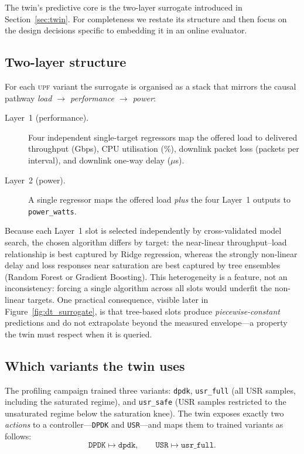 \documentclass[12pt, a4paper]{report}
\newcommand{\upf}{\textsc{upf}}
\newcommand{\code}[1]{\texttt{#1}}
\begin{document}
The twin's predictive core is the two-layer surrogate introduced in
Section~\ref{sec:twin}. For completeness we restate its structure and then
focus on the design decisions specific to embedding it in an online evaluator.

\subsection{Two-layer structure}

For each \upf{} variant the surrogate is organised as a stack that mirrors the
causal pathway \emph{load $\to$ performance $\to$ power}:

\begin{description}
  \item[Layer~1 (performance).] Four independent single-target regressors map
    the offered load to delivered throughput (Gbps), CPU utilisation (\%),
    downlink packet loss (packets per interval), and downlink one-way delay
    ($\mu$s).
  \item[Layer~2 (power).] A single regressor maps the offered load
    \emph{plus} the four Layer~1 outputs to \code{power\_watts}.
\end{description}

Because each Layer~1 slot is selected independently by cross-validated model
search, the chosen algorithm differs by target: the near-linear
throughput--load relationship is best captured by Ridge regression, whereas
the strongly non-linear delay and loss responses near saturation are best
captured by tree ensembles (Random Forest or Gradient Boosting). This
heterogeneity is a feature, not an inconsistency: forcing a single algorithm
across all slots would underfit the non-linear targets. One practical
consequence, visible later in Figure~\ref{fig:dt_surrogate}, is that
tree-based slots produce \emph{piecewise-constant} predictions and do not
extrapolate beyond the measured envelope---a property the twin must respect
when it is queried.

\subsection{Which variants the twin uses}
\label{sec:dt_variants}

The profiling campaign trained three variants: \code{dpdk},
\code{usr\_full} (all USR samples, including the saturated regime), and
\code{usr\_safe} (USR samples restricted to the unsaturated regime below the
saturation knee). The twin exposes exactly two \emph{actions} to a
controller---\code{DPDK} and \code{USR}---and maps them to trained variants as
follows:
\[
  \texttt{DPDK} \longmapsto \texttt{dpdk}, \qquad
  \texttt{USR}  \longmapsto \texttt{usr\_full}.
\]
\end{document}
